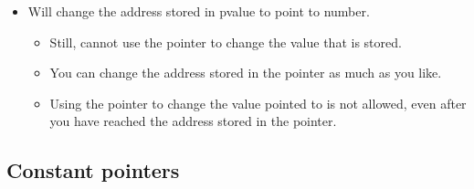 \begin{itemize}
    \item Will change the address stored in pvalue to point to number. 
        \begin{itemize}
            \item Still, cannot use the pointer to change the value that is stored. 
            \item You can change the address stored in the pointer as much as you like. 
            \item Using the pointer to change the value pointed to is not allowed, even after you have reached the address stored in the pointer. 
        \end{itemize}
\end{itemize}

\subsection{Constant pointers}
